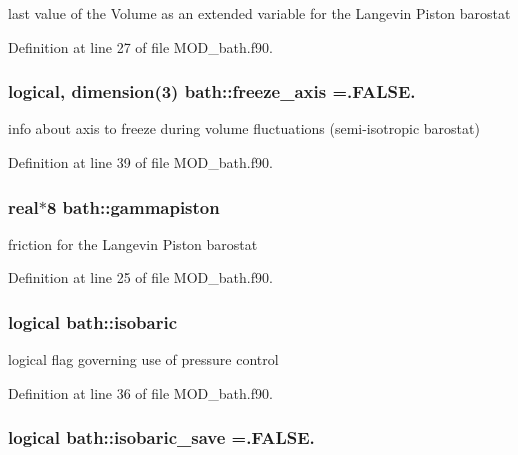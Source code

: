 last value of the Volume as an extended variable for the Langevin Piston barostat 



Definition at line 27 of file M\-O\-D\-\_\-bath.\-f90.

\hypertarget{classbath_a47529a9a6ecd22b03c1b236ea7a7acd9}{
\subsubsection[{freeze\-\_\-axis}]{\setlength{\rightskip}{0pt plus 5cm}logical, dimension(3) bath\-::freeze\-\_\-axis =.F\-A\-L\-S\-E.}}\label{classbath_a47529a9a6ecd22b03c1b236ea7a7acd9}


info about axis to freeze during volume fluctuations (semi-\/isotropic barostat) 



Definition at line 39 of file M\-O\-D\-\_\-bath.\-f90.

\hypertarget{classbath_a7b3b6c32c51e4405e4c4948d2aa3d8b9}{
\subsubsection[{gammapiston}]{\setlength{\rightskip}{0pt plus 5cm}real$\ast$8 bath\-::gammapiston}}\label{classbath_a7b3b6c32c51e4405e4c4948d2aa3d8b9}


friction for the Langevin Piston barostat 



Definition at line 25 of file M\-O\-D\-\_\-bath.\-f90.

\hypertarget{classbath_aaa4b05e6c14f0448c7d434cb61a31f41}{
\subsubsection[{isobaric}]{\setlength{\rightskip}{0pt plus 5cm}logical bath\-::isobaric}}\label{classbath_aaa4b05e6c14f0448c7d434cb61a31f41}


logical flag governing use of pressure control 



Definition at line 36 of file M\-O\-D\-\_\-bath.\-f90.

\hypertarget{classbath_a2a95f8a0816cbcbab171445abb24a216}{
\subsubsection[{isobaric\-\_\-save}]{\setlength{\rightskip}{0pt plus 5cm}logical bath\-::isobaric\-\_\-save =.F\-A\-L\-S\-E.}}\label{classbath_a2a95f8a0816cbcbab171445abb24a216}


